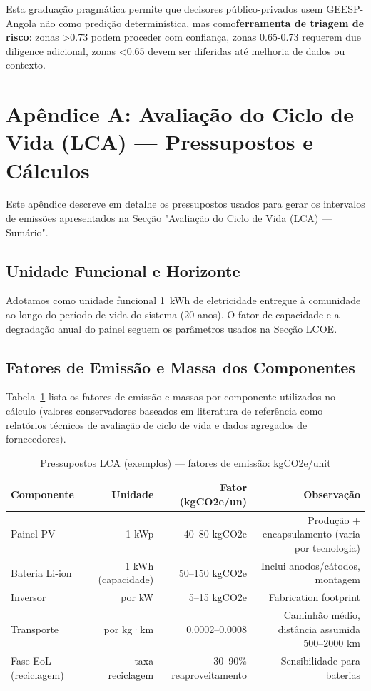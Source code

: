\documentclass[12pt, a4paper]{article}
\begin{document}
Esta graduação pragmática permite que decisores público-privados usem GEESP-Angola não como predição determinística, mas como\textbf{ferramenta de triagem de risco}: zonas >0.73 podem proceder com confiança, zonas 0.65-0.73 requerem due diligence adicional, zonas <0.65 devem ser diferidas até melhoria de dados ou contexto.

\clearpage
\appendix
\section{Apêndice A: Avaliação do Ciclo de Vida (LCA) — Pressupostos e Cálculos}
\label{app:lca}

Este apêndice descreve em detalhe os pressupostos usados para gerar os intervalos de
emissões apresentados na Secção "Avaliação do Ciclo de Vida (LCA) — Sumário".

\subsection{Unidade Funcional e Horizonte}
Adotamos como unidade funcional 1~kWh de eletricidade entregue à comunidade ao longo do
período de vida do sistema (20 anos). O fator de capacidade e a degradação anual do painel
seguem os parâmetros usados na Secção LCOE.

\subsection{Fatores de Emissão e Massa dos Componentes}
Tabela~\ref{tab:lca_assumptions} lista os fatores de emissão e massas por componente
utilizados no cálculo (valores conservadores baseados em literatura de referência como
relatórios técnicos de avaliação de ciclo de vida e dados agregados de fornecedores).

\begin{table}[H]
\centering
\caption{Pressupostos LCA (exemplos) — fatores de emissão: kgCO2e/unit}
\label{tab:lca_assumptions}
\footnotesize
\begin{tabular}{@{}lrrr@{}}
\toprule
\textbf{Componente} & \textbf{Unidade} & \textbf{Fator (kgCO2e/un)} & \textbf{Observação} \\
\midrule
Painel PV & 1 kWp & 40--80 kgCO2e & Produção + encapsulamento (varia por tecnologia) \\
Bateria Li-ion & 1 kWh (capacidade) & 50--150 kgCO2e & Inclui anodos/cátodos, montagem \\
Inversor & por kW & 5--15 kgCO2e & Fabrication footprint \\
Transporte & por kg·km & 0.0002--0.0008 & Caminhão médio, distância assumida 500--2000 km \\
Fase EoL (reciclagem) & taxa reciclagem & 30--90\% reaproveitamento & Sensibilidade para baterias \\
\bottomrule
\end{tabular}
\end{table}
\end{document}
